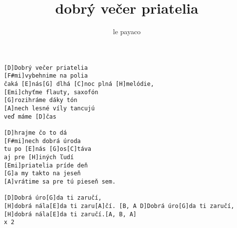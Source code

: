 \author{le payaco}
\title{dobrý večer priatelia}
\maketitle
\begin{verbatim}
[D]Dobrý večer priatelia
[F#mi]vybehnime na polia
čaká [E]nás[G] dlhá [C]noc plná [H]melódie,
[Emi]chyťme flauty, saxofón
[G]rozihráme dáky tón
[A]nech lesné víly tancujú
veď máme [D]čas

[D]hrajme čo to dá
[F#mi]nech dobrá úroda
tu po [E]nás [G]os[C]táva
aj pre [H]iných ľudí
[Emi]priatelia príde deň
[G]a my takto na jeseň
[A]vrátime sa pre tú pieseň sem.

[D]Dobrá úro[G]da ti zaručí,
[H]dobrá nála[E]da ti zaru[A]čí. [B, A D]Dobrá úro[G]da ti zaručí,
[H]dobrá nála[E]da ti zaručí.[A, B, A]
x 2
\end{verbatim}
